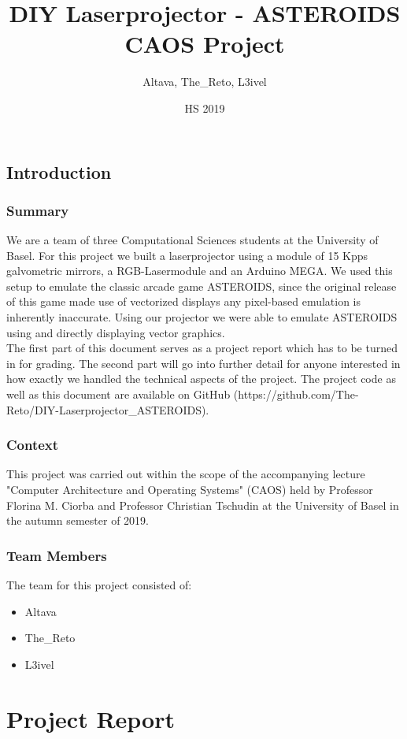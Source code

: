 \documentclass{report}
\title{ DIY Laserprojector - ASTEROIDS \\
       \large CAOS Project}
\author{Altava, The\_Reto, L3ivel}
\date{HS 2019}
\begin{document}
\maketitle

\chapter*{Introduction}
\section*{Summary}
We are a team of three Computational Sciences students at the University of Basel.
For this project we built a laserprojector using a module of 15 Kpps galvometric mirrors, a RGB-Lasermodule and an Arduino MEGA.
We used this setup to emulate the classic arcade game ASTEROIDS, since the original release of this game made use of vectorized displays any pixel-based emulation is inherently inaccurate.
Using our projector we were able to emulate ASTEROIDS using and directly displaying vector graphics.\\
The first part of this document serves as a project report which has to be turned in for grading.
The second part will go into further detail for anyone interested in how exactly we handled the technical aspects of the project.
The project code as well as this document are available on GitHub (https://github.com/The-Reto/DIY-Laserprojector\_ASTEROIDS).
\section*{Context}
This project was carried out within the scope of the accompanying lecture "Computer Architecture and Operating Systems" (CAOS) held by Professor Florina M. Ciorba and Professor Christian Tschudin at the University of Basel in the autumn semester of 2019.
\section*{Team Members}
The team for this project consisted of:
\begin{itemize}
	\item Altava
	\item The\_Reto
	\item L3ivel
\end{itemize}

\tableofcontents
\newpage

\part{Project Report}
\end{document}
